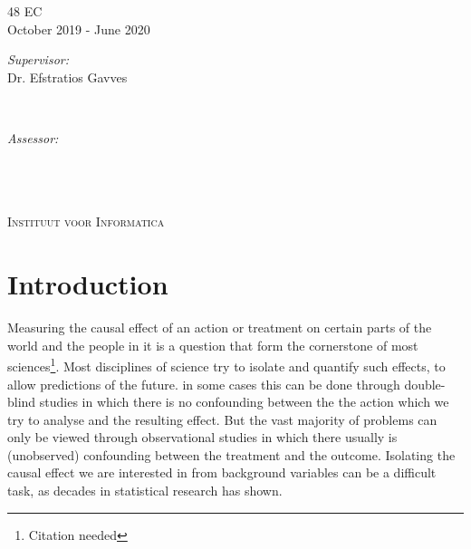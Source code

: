 \documentclass{report}
\newcommand{\red}[1]{{\color{red}{#1}}}
\begin{document}
\begin{titlepage}
48 EC\\ %
October 2019 - June 2020\\[1cm]%

\begin{minipage}[t]{0.4\textwidth}
\begin{flushleft} \large
\emph{Supervisor:} \\
Dr. Efstratios Gavves%
\end{flushleft}
\end{minipage}
~
\begin{minipage}[t]{0.4\textwidth}
\begin{flushright} \large
\emph{Assessor:} \\
\red{Dr A  \textsc{Person}}\\
\end{flushright}
\end{minipage}\\[2cm]


\framebox{\rule{0pt}{2.5cm}\rule{2.5cm}{0pt}}\\[0.5cm]
\textsc{\large Instituut voor Informatica}\\[1.0cm] %
 

\vfill %

\end{titlepage}


\tableofcontents


\chapter{Introduction}
Measuring the causal effect of an action or treatment on certain parts of the world and the people in it is a question that form the cornerstone of most sciences\footnote{\label{note:citation}Citation needed}. Most disciplines of science try to isolate and quantify such effects, to allow predictions of the future. in some cases this can be done through double-blind studies in which there is no confounding between the the action which we try to analyse and the resulting effect. But the vast majority of problems can only be viewed through observational studies in which there usually is (unobserved) confounding between the treatment and the outcome. Isolating the causal effect we are interested in from background variables can be a difficult task, as decades in statistical research has shown.
\end{document}
